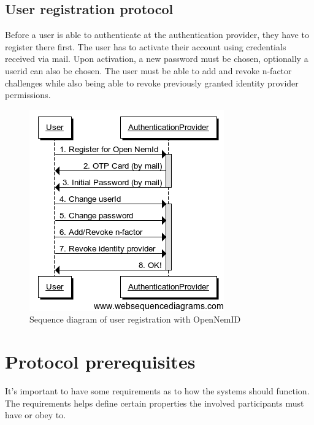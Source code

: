 \documentclass[twosided]{report}
\begin{document}
\subsection{User registration protocol}
Before a user is able to authenticate at the authentication provider, they have to register there first. The user has to activate their account using credentials received via mail. Upon activation, a new password must be chosen, optionally a userid can also be chosen. The user must be able to add and revoke n-factor challenges while also being able to revoke previously granted identity provider permissions.

\begin{figure}[H]
	\centering
	\includegraphics[scale=0.6]{images/Open-NemId-(User-Registration).png}
	\caption{Sequence diagram of user registration with OpenNemID}
\end{figure}

\section{Protocol prerequisites}
It's important to have some requirements as to how the systems should function. The requirements helps define certain properties the involved participants must have or obey to.
\end{document}
